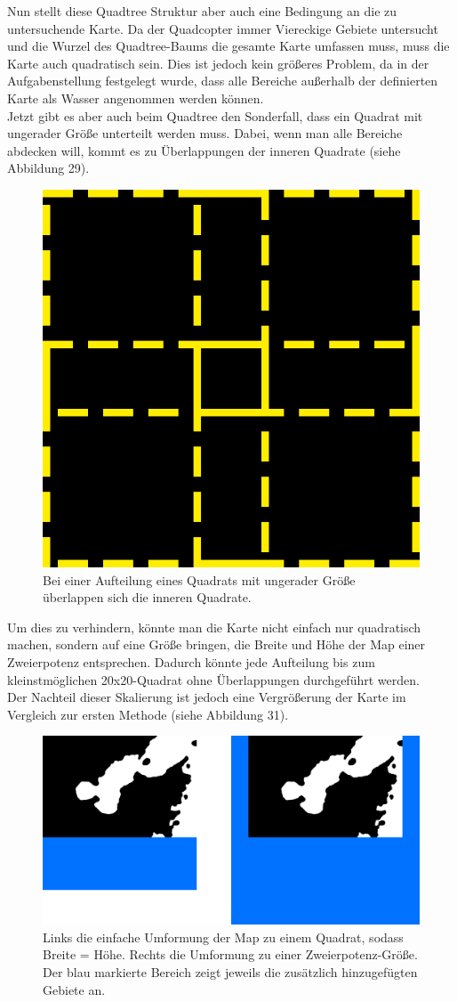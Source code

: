 \documentclass[a4paper,12pt]{article}
\begin{document}
Nun stellt diese Quadtree Struktur aber auch eine Bedingung an die zu untersuchende Karte. Da der Quadcopter immer Viereckige Gebiete untersucht und die Wurzel des Quadtree-Baums die gesamte Karte umfassen muss, muss die Karte auch quadratisch sein. Dies ist jedoch kein größeres Problem, da in der Aufgabenstellung festgelegt wurde, dass alle Bereiche außerhalb der definierten Karte als Wasser angenommen werden können.
\\[0.4cm]
Jetzt gibt es aber auch beim Quadtree den Sonderfall, dass ein Quadrat mit ungerader Größe unterteilt werden muss. Dabei, wenn man alle Bereiche abdecken will, kommt es zu Überlappungen der inneren Quadrate (siehe Abbildung 29).
\begin{figure}[H]
\centering
    \includegraphics[width=.5\linewidth]{Bilder/Aufgabe3/Quadtree_Ueberlappung.png}
    \caption{Bei einer Aufteilung eines Quadrats mit ungerader Größe überlappen sich die inneren Quadrate.}
\end{figure}

Um dies zu verhindern, könnte man die Karte nicht einfach nur quadratisch machen, sondern auf eine Größe bringen, die Breite und Höhe der Map einer Zweierpotenz entsprechen. Dadurch könnte jede Aufteilung bis zum kleinstmöglichen 20x20-Quadrat ohne Überlappungen durchgeführt werden.
\\[0.4cm]
Der Nachteil dieser Skalierung ist jedoch eine Vergrößerung der Karte im Vergleich zur ersten Methode (siehe Abbildung 31).
\begin{figure}[H]
\centering
    \includegraphics[width=.9\linewidth]{Bilder/Aufgabe3/Erweiterung_Karte.png}
    \caption{Links die einfache Umformung der Map zu einem Quadrat, sodass Breite = Höhe. Rechts die Umformung zu einer Zweierpotenz-Größe. Der blau markierte Bereich zeigt jeweils die zusätzlich hinzugefügten Gebiete an.}
\end{figure}
\end{document}
